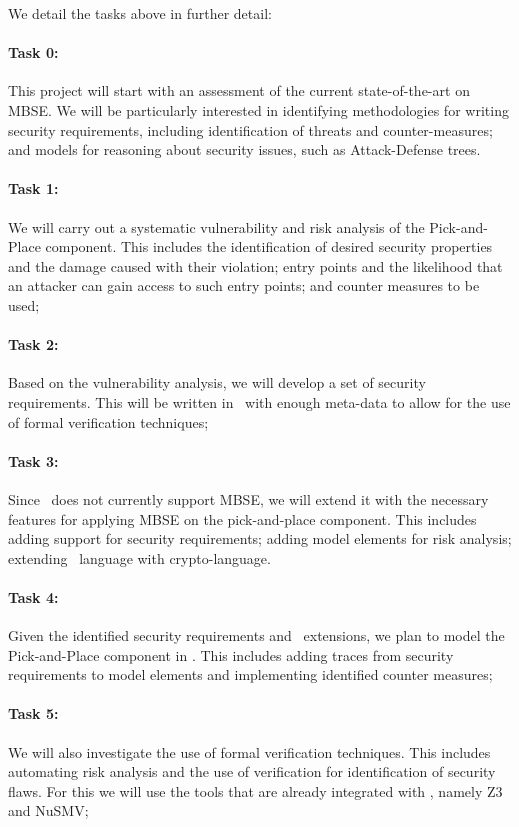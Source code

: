 We detail the tasks above in further detail:

\paragraph{Task 0:} This project will start with an assessment of the current state-of-the-art on MBSE. We will be particularly interested in identifying methodologies for writing security requirements, including identification of threats and counter-measures; and models for reasoning about security issues, such as Attack-Defense trees. 

\paragraph{Task 1:} We will carry out a systematic vulnerability and risk analysis of the Pick-and-Place component. This includes the identification of desired security properties and the damage caused with their violation; entry points and the likelihood that an attacker can gain access to such entry points; and counter measures to be used;

\paragraph{Task 2:} Based on the vulnerability analysis, we will develop a set of security requirements. This will be written in \autofocus\ with enough meta-data to allow for the use of formal verification techniques;

\paragraph{Task 3:} Since \autofocus\ does not currently support MBSE, we will extend it with the necessary features for applying MBSE on the pick-and-place component. This includes adding support for security requirements; adding model elements for risk analysis; extending \autofocus\ language with crypto-language.

\paragraph{Task 4:} Given the identified security requirements and \autofocus\ extensions, we plan to model the Pick-and-Place component in \autofocus. This includes adding traces from security requirements to model elements and implementing identified counter measures;

\paragraph{Task 5:} We will also investigate the use of formal verification techniques. This includes automating risk analysis and the use of verification for identification of security flaws. For this we will use the tools that are already integrated with \autofocus, namely Z3 and NuSMV;

